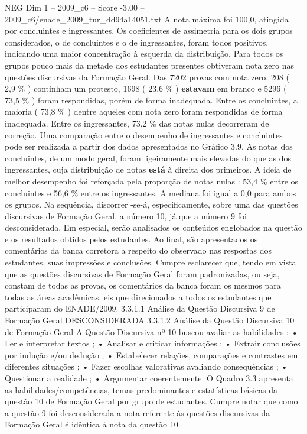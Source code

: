 \begin{textsample}{NEG Dim 1 – 2009\_c6 – Score -3.00 – 2009\_c6/enade\_2009\_tur\_dd94a14051.txt}
A nota máxima foi 100,0, atingida por concluintes e ingressantes.
Os coeficientes de assimetria para os dois grupos considerados, o de concluintes e o de ingressantes, foram todos positivos, indicando uma maior concentração à esquerda da distribuição.
Para todos os grupos pouco mais da metade dos estudantes presentes obtiveram nota zero nas questões discursivas da Formação Geral.
Das 7202 provas com nota zero, 208 ( 2,9 \% ) continham um protesto, 1698 ( 23,6 \% ) \textbf{estavam} em branco e 5296 ( 73,5 \% ) foram respondidas, porém de forma inadequada.
Entre os concluintes, a maioria ( 73,8 \% ) dentre aqueles com nota zero foram respondidas de forma inadequada.
Entre os ingressantes, 73,2 \% das notas nulas decorreram de correção.
Uma comparação entre o desempenho de ingressantes e concluintes pode ser realizada a partir dos dados apresentados no Gráfico 3.9.
As notas dos concluintes, de um modo geral, foram ligeiramente mais elevadas do que as dos ingressantes, cuja distribuição de notas \textbf{está} à direita dos primeiros.
A ideia de melhor desempenho foi reforçada pela proporção de notas nulas : 53,4 \% entre os concluintes e 56,6 \% entre os ingressantes.
A mediana foi igual a 0,0 para ambos os grupos.
Na sequência, discorrer -se-á, especificamente, sobre uma das questões discursivas de Formação Geral, a número 10, já que a número 9 foi desconsiderada.
Em especial, serão analisados os conteúdos englobados na questão e os resultados obtidos pelos estudantes.
Ao final, são apresentados os comentários da banca corretora a respeito do observado nas respostas dos estudantes, suas impressões e conclusões.
Cumpre esclarecer que, tendo em vista que as questões discursivas de Formação Geral foram padronizadas, ou seja, constam de todas as provas, os comentários da banca foram os mesmos para todas as áreas acadêmicas, eis que direcionados a todos os estudantes que participaram do ENADE/2009. 3.3.1.1 Análise da Questão Discursiva 9 de Formação Geral DESCONSIDERADA 3.3.1.2 Análise da Questão Discursiva 10 de Formação Geral A Questão Discursiva nº 10 buscou avaliar as habilidades : • Ler e interpretar textos ; • Analisar e criticar informações ; • Extrair conclusões por indução e/ou dedução ; • Estabelecer relações, comparações e contrastes em diferentes situações ; • Fazer escolhas valorativas avaliando consequências ; • Questionar a realidade ; • Argumentar coerentemente.
O Quadro 3.3 apresenta as habilidades/competências, temas predominantes e estatísticas básicas da questão 10 de Formação Geral por grupo de estudantes.
Cumpre notar que como a questão 9 foi desconsiderada a nota referente às questões discursivas da Formação Geral é idêntica à nota da questão 10.

\end{textsample}
